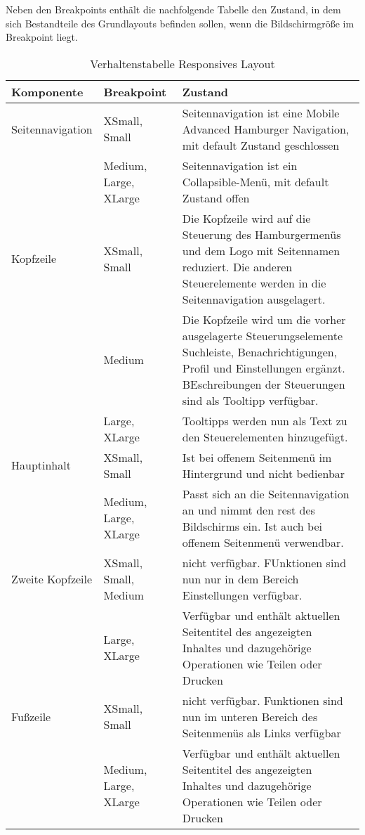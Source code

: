 Neben den Breakpoints enthält die nachfolgende Tabelle den Zustand, in dem sich Bestandteile des Grundlayouts befinden sollen, wenn die Bildschirmgröße im Breakpoint liegt.

\begin{table}[H]
    \caption{Verhaltenstabelle Responsives Layout}
    \label{tbl:verhaltRespons}
    \begin{tabularx}{\textwidth}[ht]{|l|l|X|}
        \hline
        \textbf{Komponente} & \textbf{Breakpoint}   & \textbf{Zustand}                                                                                \\
        \hline\hline
        Seitennavigation & XSmall, Small & Seitennavigation ist eine Mobile Advanced Hamburger Navigation, mit default Zustand geschlossen \\
        & Medium, Large, XLarge & Seitennavigation ist ein Collapsible-Menü, mit default Zustand offen                            \\
        \hline\hline
        Kopfzeile & XSmall, Small & Die Kopfzeile wird auf die Steuerung des Hamburgermenüs und dem Logo mit Seitennamen reduziert. Die anderen Steuerelemente werden in die Seitennavigation ausgelagert. \\
        & Medium & Die Kopfzeile wird um die vorher ausgelagerte Steuerungselemente Suchleiste, Benachrichtigungen, Profil und Einstellungen ergänzt. BEschreibungen der Steuerungen sind als Tooltipp verfügbar. \\
        & Large, XLarge & Tooltipps werden nun als Text zu den Steuerelementen hinzugefügt. \\
        \hline\hline
        Hauptinhalt & XSmall, Small & Ist bei offenem Seitenmenü im Hintergrund und nicht bedienbar \\
        & Medium, Large, XLarge & Passt sich an die Seitennavigation an und nimmt den rest des Bildschirms ein. Ist auch bei offenem Seitenmenü verwendbar. \\
        \hline\hline
        Zweite Kopfzeile & XSmall, Small, Medium & nicht verfügbar. FUnktionen sind nun nur in dem Bereich Einstellungen verfügbar. \\
        & Large, XLarge & Verfügbar und enthält aktuellen Seitentitel des angezeigten Inhaltes und dazugehörige Operationen wie Teilen oder Drucken \\
        \hline\hline
        Fußzeile & XSmall, Small & nicht verfügbar. Funktionen sind nun im unteren Bereich des Seitenmenüs als Links verfügbar\\
        & Medium, Large, XLarge & Verfügbar und enthält aktuellen Seitentitel des angezeigten Inhaltes und dazugehörige Operationen wie Teilen oder Drucken \\
        \hline
    \end{tabularx} \\
    \cite[Quelle: In Anlehnung an https://material.angular.io/cdk/layout/overview][S. 4]{Beckert.2012}
\end{table}

